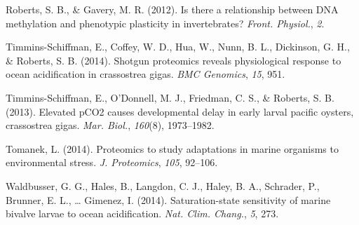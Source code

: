 \documentclass [11pt, proquest] {uwthesis}[2015/03/03]
\newlength{\cslhangindent}
\newenvironment{CSLReferences}%
{\setlength{\parindent}{0pt}%
\everypar{\setlength{\hangindent}{\cslhangindent}}\ignorespaces}%
{\par}
\begin{document}
\begin{CSLReferences}{1}{0}
\leavevmode\hypertarget{ref-Roberts2012}{}%
Roberts, S. B., \& Gavery, M. R. (2012). Is there a relationship between {DNA} methylation and phenotypic plasticity in invertebrates? \emph{Front. Physiol.}, \emph{2}.

\leavevmode\hypertarget{ref-Timmins-Schiffman2014}{}%
Timmins-Schiffman, E., Coffey, W. D., Hua, W., Nunn, B. L., Dickinson, G. H., \& Roberts, S. B. (2014). Shotgun proteomics reveals physiological response to ocean acidification in crassostrea gigas. \emph{BMC Genomics}, \emph{15}, 951.

\leavevmode\hypertarget{ref-Timmins-Schiffman2013}{}%
Timmins-Schiffman, E., O'Donnell, M. J., Friedman, C. S., \& Roberts, S. B. (2013). Elevated {pCO2} causes developmental delay in early larval pacific oysters, crassostrea gigas. \emph{Mar. Biol.}, \emph{160}(8), 1973--1982.

\leavevmode\hypertarget{ref-Tomanek2014}{}%
Tomanek, L. (2014). Proteomics to study adaptations in marine organisms to environmental stress. \emph{J. Proteomics}, \emph{105}, 92--106.

\leavevmode\hypertarget{ref-Waldbusser2014}{}%
Waldbusser, G. G., Hales, B., Langdon, C. J., Haley, B. A., Schrader, P., Brunner, E. L., \ldots{} Gimenez, I. (2014). Saturation-state sensitivity of marine bivalve larvae to ocean acidification. \emph{Nat. Clim. Chang.}, \emph{5}, 273.

\end{CSLReferences}
\end{document}
